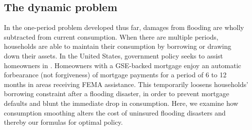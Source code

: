 \documentclass[12pt]{article}
\begin{document}


\subsection{The dynamic problem}

In the one-period problem developed thus far, damages from flooding are wholly subtracted from current consumption. When there are multiple periods, households are able to maintain their consumption by borrowing or drawing down their assets. In the United States, government policy seeks to assist homeowners in . Homeowners with a GSE-backed mortgage enjoy an automatic forbearance (not forgiveness) of mortgage payments for a period of 6 to 12 months in areas receiving FEMA assistance. This temporarily loosens households' borrowing constraint after a flooding disaster, in order to prevent mortgage defaults and blunt the immediate drop in consumption. Here, we examine how consumption smoothing alters the cost of uninsured flooding disasters and thereby our formulas for optimal policy.   
\end{document}
